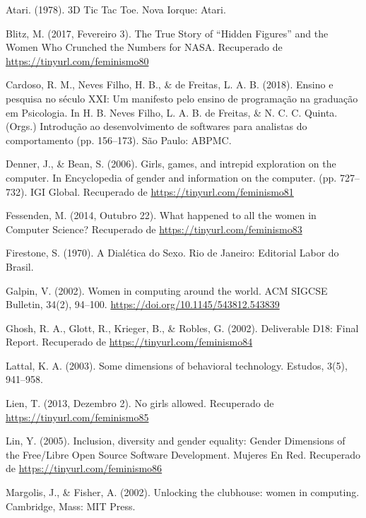\hangindent=25pt
\noindent Atari. (1978). 3D Tic Tac Toe. Nova Iorque: Atari.

\hangindent=25pt
\noindent Blitz, M. (2017, Fevereiro 3). The True Story of “Hidden Figures” and the Women Who Crunched the Numbers for NASA. Recuperado de \url{https://tinyurl.com/feminismo80}

\hangindent=25pt
\noindent Cardoso, R. M., Neves Filho, H. B., \& de Freitas, L. A. B. (2018). Ensino e pesquisa no século XXI: Um manifesto pelo ensino de programação na graduação em Psicologia. In H. B. Neves Filho, L. A. B. de Freitas, \& N. C. C. Quinta. (Orgs.) Introdução ao desenvolvimento de softwares para analistas do comportamento (pp. 156–173). São Paulo: ABPMC.

\hangindent=25pt
\noindent Denner, J., \& Bean, S. (2006). Girls, games, and intrepid exploration on the computer. In Encyclopedia of gender and information on the computer. (pp. 727–732). IGI Global. Recuperado de \url{https://tinyurl.com/feminismo81}

\hangindent=25pt
\noindent Fessenden, M. (2014, Outubro 22). What happened to all the women in Computer Science? Recuperado de \url{https://tinyurl.com/feminismo83}

\hangindent=25pt
\noindent Firestone, S. (1970). A Dialética do Sexo. Rio de Janeiro: Editorial Labor do Brasil.

\hangindent=25pt
\noindent Galpin, V. (2002). Women in computing around the world. ACM SIGCSE Bulletin, 34(2), 94–100. \url{https://doi.org/10.1145/543812.543839}

\hangindent=25pt
\noindent Ghosh, R. A., Glott, R., Krieger, B., \& Robles, G. (2002). Deliverable D18: Final Report. Recuperado de \url{https://tinyurl.com/feminismo84}

\hangindent=25pt
\noindent Lattal, K. A. (2003). Some dimensions of behavioral technology. Estudos, 3(5), 941–958.

\hangindent=25pt
\noindent Lien, T. (2013, Dezembro 2). No girls allowed. Recuperado de \url{https://tinyurl.com/feminismo85}

\hangindent=25pt
\noindent Lin, Y. (2005). Inclusion, diversity and gender equality: Gender Dimensions of the Free/Libre Open Source Software Development. Mujeres En Red. Recuperado de \url{https://tinyurl.com/feminismo86}

\hangindent=25pt
\noindent Margolis, J., \& Fisher, A. (2002). Unlocking the clubhouse: women in computing. Cambridge, Mass: MIT Press.

